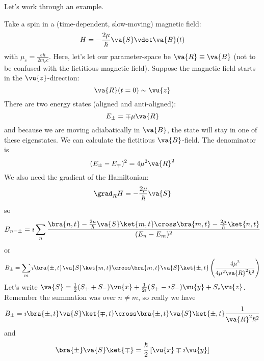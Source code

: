 \documentclass[a4paper,twoside,master.tex]{subfiles}
\begin{document}
Let's work through an example.
\begin{ex}
    Take a spin in a (time-dependent, slow-moving) magnetic field:
    \begin{equation}
        H = - \frac{2 \mu}{\hbar} \va{S} \vdot \va{B}(t)
    \end{equation}
    with $ \mu_e = \frac{eh}{2m_e c} $. Here, let's let our parameter-space be $ \va{R} \equiv \va{B} $ (not to be confused with the fictitious magnetic field). Suppose the magnetic field starts in the $ \vu{z} $-direction:
    \begin{equation}
        \va{R}(t=0) \sim \vu{z}
    \end{equation}
    There are two energy states (aligned and anti-aligned):
    \begin{equation}
        E_{\pm} = \mp \mu \va{R}
    \end{equation}
    and because we are moving adiabatically in $ \va{B} $, the state will stay in one of these eigenstates. We can calculate the fictitious $ \va{B} $-field. The denominator is
    \begin{equation}
        (E_{\pm} - E_{\mp})^2 = 4 \mu^2 \va{R}^2
    \end{equation}
    We also need the gradient of the Hamiltonian:
    \begin{equation}
        \grad_R{H} = - \frac{2 \mu}{\hbar} \va{S}
    \end{equation}
    so
    \begin{equation}
        B_{n=\pm} = \imath \sum_n \frac{\bra{n,t} - \frac{2 \mu}{\hbar} \va{S}\ket{m,t} \cross\bra{m,t} - \frac{2 \mu}{\hbar}\ket{n,t}}{(E_n - E_m)^2}
    \end{equation}
    or
    \begin{equation}
        B_{\pm} = \sum_m \imath\bra{\pm,t} \va{S}\ket{m,t} \cross\bra{m,t} \va{S}\ket{\pm,t} \left( \frac{4 \mu^2}{4 \mu^2 \va{R}^2 \hbar^2} \right)
    \end{equation}
    Let's write $ \va{S} = \frac{1}{2} (S_+ + S_-) \vu{x} + \frac{1}{2 \imath} (S_+ - \imath S_-) \vu{y} + S_z \vu{z} $. Remember the summation was over $ n \neq m $, so really we have
    \begin{equation}
        B_{\pm} = \imath\bra{\pm, t} \va{S}\ket{\mp, t} \cross\bra{\pm, t} \va{S}\ket{\pm, t} \frac{1}{\va{R}^2 \hbar^2}
    \end{equation}
    and
    \begin{equation}
        \bra{\pm} \va{S}\ket{\mp} = \frac{\hbar}{2} \left[ \vu{x} \mp \imath \vu{y} \right]

\end{equation}
\end{ex}
\end{document}
